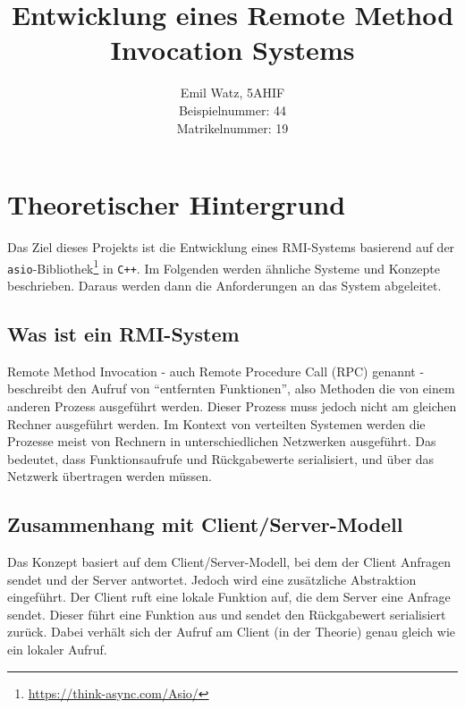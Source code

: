 \documentclass[a4paper,oneside,10pt]{report}
\begin{document}
\pagestyle{empty} 

\title{Entwicklung eines Remote Method Invocation Systems}
\author{Emil Watz, 5AHIF \protect\\Beispielnummer: 44 \protect\\Matrikelnummer: 19}
\maketitle
\tableofcontents 
\cleardoublepage 

\pagestyle{plain} 


\chapter{Theoretischer Hintergrund}

Das Ziel dieses Projekts ist die Entwicklung eines RMI-Systems basierend auf der \texttt{asio}-Bibliothek\footnote{\url{https://think-async.com/Asio/}} in \texttt{C++}. Im Folgenden werden ähnliche Systeme und Konzepte beschrieben. Daraus werden dann die Anforderungen an das System abgeleitet.  

\section{Was ist ein RMI-System}

Remote Method Invocation - auch Remote Procedure Call (RPC) genannt - beschreibt den Aufruf von "`entfernten Funktionen"', also Methoden die von einem anderen Prozess ausgeführt werden. Dieser Prozess muss jedoch nicht am gleichen Rechner ausgeführt werden. Im Kontext von verteilten Systemen werden die Prozesse meist von Rechnern in unterschiedlichen Netzwerken ausgeführt. Das bedeutet, dass Funktionsaufrufe und Rückgabewerte serialisiert, und über das Netzwerk übertragen werden müssen. 


\section{Zusammenhang mit Client/Server-Modell}

Das Konzept basiert auf dem Client/Server-Modell, bei dem der Client Anfragen sendet und der Server antwortet. Jedoch wird eine zusätzliche Abstraktion eingeführt. Der Client ruft eine lokale Funktion auf, die dem Server eine Anfrage sendet. Dieser führt eine Funktion aus und sendet den Rückgabewert serialisiert zurück. Dabei verhält sich der Aufruf am Client (in der Theorie) genau gleich wie ein lokaler Aufruf. 
\end{document}
